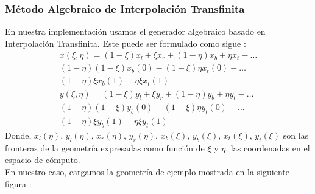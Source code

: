 \documentclass[11pt,letterpaper]{article}
\begin{document}
\subsubsection{Método Algebraico de Interpolación Transfinita}
En nuestra implementaci\'on usamos el generador algebraico basado en Interpolaci\'on Transfinita. Este puede ser formulado como sigue :
		\begin{gather*}
			x( \xi, \eta ) = ( 1 - \xi ) x_{l} + \xi x_{r} + ( 1 - \eta ) x_{b} + \eta x_{t} - \hdots \\
							 ( 1 - \eta ) ( 1 - \xi ) x_{b}(0) - ( 1 - \xi ) \eta x_{t}(0) - \hdots \\
							 ( 1 - \eta ) \xi x_{b}(1) - \eta \xi x_{t}(1)
			\\
			y( \xi, \eta ) = ( 1 - \xi ) y_{l} + \xi y_{r} + ( 1 - \eta ) y_{b} + \eta y_{t} - \hdots \\
							 ( 1 - \eta ) ( 1 - \xi ) y_{b}(0) - ( 1 - \xi ) \eta y_{t}(0) - \hdots \\
							 ( 1 - \eta ) \xi y_{b}(1) - \eta \xi y_{t}(1)
		\end{gather*}
		Donde, $x_l(\eta)$, $y_l(\eta)$, $x_r(\eta)$, $y_r(\eta)$, $x_b(\xi)$, $y_b(\xi)$, $x_t(\xi)$, $y_t(\xi)$ son las
		fronteras de la geometr\'ia expresadas como funci\'on de $ \xi $ y $ \eta $, las coordenadas en el espacio de 
		c\'omputo.
		\\
		En nuestro caso, cargamos la geometr\'ia de ejemplo mostrada en la siguiente figura :
\end{document}

